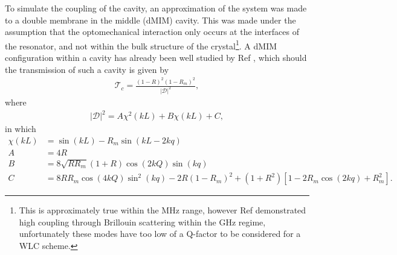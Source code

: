 \documentclass[aps,  
                a4paper, 
                amsmath, 
                amssymb, 
                preprint,
                tightenlines,  
                amsfonts,
                nofootinbib,
                onecolumn,
                titlepage,
                10pt
            ]{revtex4-2}
\begin{document}
    To simulate the coupling of the cavity, an approximation of the system was made to a double membrane in the middle (dMIM) cavity. This was made under the assumption that the optomechanical interaction only occurs at the interfaces of the resonator, and not within the bulk structure of the crystal\footnote{This is approximately true within the MHz range, however Ref \cite{kharel2019} demonstrated high coupling through Brillouin scattering within the GHz regime, unfortunately these modes have too low of a Q-factor to be considered for a WLC scheme.}. A dMIM configuration within a cavity has already been well studied by Ref \cite{li2016}, which should the transmission of such a cavity is given by
    \begin{align}
        \label{eq:transmission-dmim}
        \mathcal{T}_c=\frac{(1-R)^2(1-R_m)^2}{\vert\mathcal{D}\vert^2},
    \end{align} 
    where
    \begin{align}
        \label{eq:transmission-dmim-denom}
        \vert\mathcal{D}\vert^2=A\chi^2(kL)+B\chi(kL)+C,
    \end{align}
    in which
    \begin{align}
        \chi(kL)&=\sin({kL})-R_m\sin{(kL-2kq)}\nonumber\\
        A&=4R\nonumber\\
        B&=8\sqrt{RR_m}(1+R)\cos{(2kQ)}\sin{(kq)}\nonumber\\
        C&=8RR_m\cos(4kQ)\sin^2(kq)-2R(1-R_m)^2+(1+R^2)[1-2R_m\cos(2kq)+R_m^2].
    \end{align}
\end{document}
